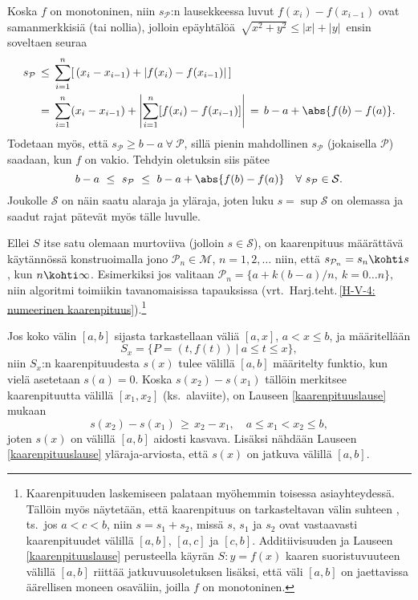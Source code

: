\tod  Koska $f$ on monotoninen, niin $s_\mathcal{P}$:n lausekkeessa luvut $f(x_i)-f(x_{i-1})$
ovat samanmerkkisiä (tai nollia), jolloin epäyhtälöä $\,\sqrt{x^2+y^2}\le|x|+|y|\,$ ensin
soveltaen seuraa
\begin{align*}
s_\mathcal{P}\, &\le\, \sum_{i=1}^n [\,(x_i-x_{i-1})+|f(x_i)-f(x_{i-1})|\,] \\
               &=\, \sum_{i=1}^n (x_i-x_{i-1})+\left|\sum_{i=1}^n [f(x_i)-f(x_{i-1})]\right|
             \,=\, b-a+\abs{f(b)-f(a)}.
\end{align*}
Todetaan myös, että $s_\mathcal{P} \ge b-a\ \forall\ \mathcal{P}$, sillä pienin mahdollinen
$s_\mathcal{P}$ (jokaisella $\mathcal{P}$) saadaan, kun $f$ on vakio. Tehdyin oletuksin 
siis pätee
\[
b-a\ \le\ s_\mathcal{P}\ \le\ b-a+\abs{f(b)-f(a)} \quad \forall\ s_\mathcal{P}\in\mathcal{S}.
\]
Joukolle $\mathcal{S}$ on näin saatu alaraja ja yläraja, joten luku $s=\sup\mathcal{S}$ on
olemassa ja saadut rajat pätevät myös tälle luvulle. \loppu

Ellei $S$ itse satu olemaan murtoviiva (jolloin $s\in\mathcal{S}$), on kaarenpituus määrättävä
käytännössä konstruoimalla jono $\mathcal{P}_n\in\mathcal{M}$, $n=1,2,\ldots$ niin, että 
$s_{\mathcal{P}_n}=s_n\kohti s$, kun $n\kohti\infty$. Esimerkiksi jos valitaan 
$\mathcal{P}_n = \{a + k(b-a)/n,\ k = 0 \ldots n\}$, niin algoritmi toimiikin tavanomaisissa
tapauksissa (vrt.\ Harj.teht.\,\ref{H-V-4: numeerinen
kaarenpituus}).\footnote[2]{Kaarenpituuden laskemiseen palataan myöhemmin toisessa
asiayhteydessä. Tällöin myös näytetään, että kaarenpituus on tarkasteltavan välin suhteen
, ts.\ jos $a<c<b$, niin $s=s_1+s_2$, missä $s$, $s_1$ ja $s_2$ ovat
vastaavasti kaarenpituudet välillä $[a,b]$, $[a,c]$ ja $[c,b]$. Additiivisuuden ja Lauseen
\ref{kaarenpituuslause} perusteella käyrän $S: y=f(x)$ kaaren suoristuvuuteen välillä $[a,b]$
riittää jatkuvuusoletuksen lisäksi, että väli $[a,b]$ on jaettavissa äärellisen moneen
osaväliin, joilla $f$ on monotoninen.}

Jos koko välin $[a,b]$ sijasta tarkastellaan väliä $[a,x]$, $a<x \le b$, ja määritellään
\[
S_x=\{P=(t,f(t)) \ | \ a\leq t\leq x\},
\]
niin $S_x$:n kaarenpituudesta $s(x)$ tulee välillä $[a,b]$ määritelty funktio, kun vielä 
asetetaan $s(a)=0$. Koska $s(x_2)-s(x_1)$ tällöin merkitsee kaarenpituutta välillä $[x_1,x_2]$
(ks.\ alaviite), on Lauseen \ref{kaarenpituuslause} mukaan
\[
s(x_2)-s(x_1)\,\ge\,x_2-x_1,\quad a \le x_1 < x_2 \le b,
\]
joten $s(x)$ on välillä $[a,b]$ aidosti kasvava. Lisäksi nähdään Lauseen
\ref{kaarenpituuslause} yläraja-arviosta, että $s(x)$ on jatkuva välillä $[a,b]$.

